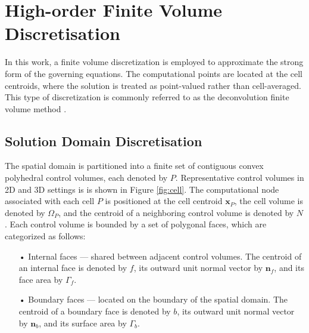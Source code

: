 \documentclass[sn-mathphys,Numbered]{sn-jnl}%
\newcommand{\bb}{\boldsymbol}
\begin{document}
\section{High-order Finite Volume Discretisation}
\label{sec:math_model}
%
%
In this work, a finite volume discretization is employed to approximate the strong form of the governing equations. 
The computational points are located at the cell centroids, where the solution is treated as point-valued rather than cell-averaged. 
This type of discretization is commonly referred to as the deconvolution finite volume method \cite{Nishikawa2025, Nishikawa2021}.
%
\subsection{Solution Domain Discretisation}
%
The spatial domain is partitioned into a finite set of contiguous convex polyhedral control volumes, each denoted by $P$.
Representative control volumes in 2D and 3D settings is is shown in Figure \ref{fig:cell}. 
The computational node associated with each cell $P$ is positioned at the cell centroid $\bb{x}_P$, the cell volume is denoted by $\Omega_P$,
and the centroid of a neighboring control volume is denoted by $N$.
Each control volume is bounded by a set of polygonal faces, which are categorized as follows:
\begin{itemize}
\item[•] Internal faces — shared between adjacent control volumes. The centroid of an internal face is denoted by $f$, its outward unit normal vector by $\bb{n}_f$, and its face area by $\Gamma_f$.
\item[• ] Boundary faces — located on the boundary of the spatial domain. The centroid of a boundary face is denoted by $b$, its outward unit normal vector by $\bb{n}_b$, and its surface area by $\Gamma_b$. 
\end{itemize}
%
\end{document}

